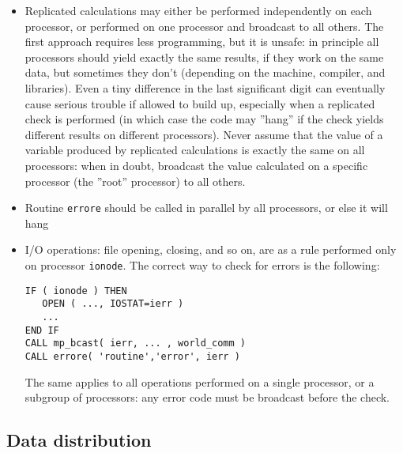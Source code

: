 \documentclass[12pt,a4paper]{article}
\begin{document}
\begin{itemize}
\item
Replicated calculations may either be performed independently on 
each processor, or performed on one processor and broadcast to all
others. The first approach requires less programming, but it is unsafe:
in principle all processors should yield exactly the same results, if 
they work on the same data, but sometimes they don't (depending on the
machine, compiler, and libraries). Even a tiny difference in the last 
significant digit can eventually cause serious trouble if allowed to
 build up, especially when a replicated check is performed (in which
case the code may ''hang'' if the check yields different results on 
different processors). Never assume that the value of a variable produced 
by replicated calculations is exactly the same on all processors: when in 
doubt, broadcast the value calculated on a specific processor (the ''root'' 
processor) to all others.
\item
Routine \texttt{errore} should be called in parallel by all processors,
or else it will hang
\item
I/O operations: file opening, closing, and so on, are as a rule performed 
only on processor \texttt{ionode}. The correct way to check for errors is 
the following:
\begin{verbatim}
IF ( ionode ) THEN
   OPEN ( ..., IOSTAT=ierr )
   ...
END IF
CALL mp_bcast( ierr, ... , world_comm )
CALL errore( 'routine','error', ierr )
\end{verbatim}
The same applies to all operations performed on a single processor,
or a subgroup of processors: any error code must be broadcast before
the check.
\end{itemize}

\subsection{Data distribution}
\end{document}

